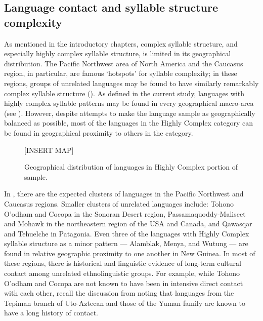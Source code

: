 \subsection{Language contact and syllable structure complexity}\label{sec:8.4.5}

  As mentioned in the introductory chapters, complex syllable structure, and especially highly complex syllable structure, is limited in its geographical distribution. The Pacific Northwest area of North America and the Caucasus region, in particular, are famous ‘hotspots’ for syllable complexity; in these regions, groups of unrelated languages may be found to have similarly remarkably complex syllable structure (\citealt{Chirikba2008,ThompsonKinkade1990}). As defined in the current study, languages with highly complex syllable patterns may be found in every geographical macro-area (see ). However, despite attempts to make the language sample as geographically balanced as possible, most of the languages in the Highly Complex category can be found in geographical proximity to others in the category.

  
\begin{figure}
{}[INSERT MAP]

\caption{\label{fig:8.1} Geographical distribution of languages in Highly Complex portion of sample.}
\end{figure}

  In , there are the expected clusters of languages in the Pacific Northwest and Caucasus regions. Smaller clusters of unrelated languages include: Tohono O’odham and Cocopa in the Sonoran Desert region, Passamaquoddy-Maliseet and Mohawk in the northeastern region of the USA and Canada, and Qawasqar and Tehuelche in Patagonia. Even three of the languages with Highly Complex syllable structure as a minor pattern — Alamblak, Menya, and Wutung — are found in relative geographic proximity to one another in New Guinea. In most of these regions, there is historical and linguistic evidence of long-term cultural contact among unrelated ethnolinguistic groups. For example, while Tohono O’odham and Cocopa are not known to have been in intensive direct contact with each other, recall the discussion from  noting that languages from the Tepiman branch of Uto-Aztecan and those of the Yuman family are known to have a long history of contact. 

